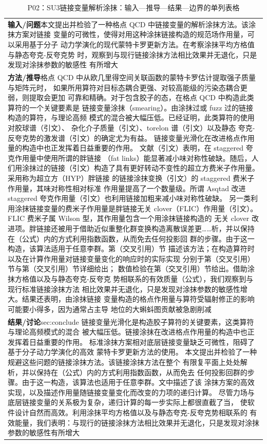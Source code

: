 \documentclass[UTF8,11pt,oneside]{ctexbook}
\begin{document}
\begin{table}[htbp]
  \centering
  \caption*{P02：SU3链接变量解析涂抹：输入—推导—结果—边界的单列表格}
  \small
  \begin{tabular}{@{}p{}@{}}
    \toprule
    \textbf{输入/问题}\quad 本文提出并检验了一种格点 QCD 中链接变量的解析涂抹方法。该涂抹方案对链接 变量的可微性，使得对用这种涂抹链接构造的规范场作用量，可以采用基于分子 动力学演化的现代蒙特卡罗更新方法。在考察涂抹平均方格值与静态夸克-反夸克势 时，观察到与现行链接涂抹方法相比效果并无退化，只是发现对涂抹参数的敏感性 有所增大 \\
    \textbf{方法/推导}\quad 格点 QCD 中从欧几里得空间关联函数的蒙特卡罗估计提取强子质量与矩阵元时， 如果所用算符对目标态耦合更强、对较高能级的污染态耦合更弱，则提取会更加 可靠和精确。对于包含胶子的态，在格点 QCD 中构造此类算符的一个关键要素是 链接变量涂抹（smearing）。由涂抹过或 fuzz 过的链接构造的算符，与理论高频 模式的混合被大幅压低。已经证明，此类算符的使用对胶球谱（引文）、 杂化介子质量（引文）、torelon 谱（引文）以及静态 夸克-反夸克势的激发谱（引文）的确定尤为有益。 链接变量光滑化在改进格点作用量的构造中也正发挥着日益重要的作用。 文献（引文）表明，在 staggered 夸克作用量中使用所谓的胖链接 （fat links）能显著减小味对称性破缺。随后，人们用涂抹过的链接（引文）构造了具有更好转动不变性的超立方费米子作用量。采用称为超立方（HYP）胖链接 的链接涂抹变换（引文）的 staggered 费米子作用量，其味对称性相对标准 作用量提高了一个数量级。所谓 Asqtad 改进 staggered 夸克作用量（引文）也利用链接加粗来减小味对称性破缺。 另一类利用涂抹链接变量的费米子作用量是胖链接无关 clover（FLIC）作用量（引文）。FLIC 费米子属 Wilson 型，其作用量包含一个用涂抹链接构造的 无关 clover 改进项。胖链接还被用于借助近似重整化群变换构造离散误差更……析，并以保持在（公式）内的方式利用指数函数，从而免去任何投影回 群的步骤。由于这一构造，该算法适用于任意李群。第（交叉引用）节 描述该方法；在构造算符时以及在计算作用量对链接变量变化的响应时的实际实现 分别于第（交叉引用）节与第（交叉引用）节详细给出； 数值检验在第（交叉引用）节给出。借助涂抹方格值以及与静态夸克-反夸克 势相联系的有效质量（公式），我们观察到与现行标准链接涂抹方法 相比效果并无退化，只是发现对涂抹参数的敏感性增大。结果还表明，由涂抹链接 变量构造的格点作用量与算符受辐射修正的影响可能要小得多，因为通常占主导 地位的大蝌蚪图贡献被急剧削减 \\
    \textbf{结果/讨论}\quad sec:conclude 链接变量光滑化是构造胶子算符的关键要素，这类算符与理论高频模式的混合 被大幅压低。链接涂抹在改进格点作用量的构造中也正发挥着日益重要的作用。 标准涂抹方案相对底层链接变量缺乏可微性，阻碍了基于分子动力学演化的高效 蒙特卡罗更新方法的使用。 本文提出并检验了一种规避这些问题的链接涂抹方法。该链接涂抹方法在整个 有限复平面上处处解析，并以保持在（公式）内的方式利用指数函数，从而免去 任何投影回群的步骤。由于这一构造，该算法也适用于任意李群。文中描述了该 涂抹方案的高效实现，以及描述作用量随链接变量变化而改变的力项的递归计算。 尽管力场与底层链接变量的关系极为复杂，递归计算的每一步实际上都很直截了当， 使软件设计自然而高效。利用涂抹平均方格值以及与静态夸克-反夸克势相联系的 有效能量，我们表明：与现行的链接涂抹方法相比效果并无退化，只是发现对涂抹 参数的敏感性有所增大 \\

\end{tabular}
\end{table}
\end{document}
